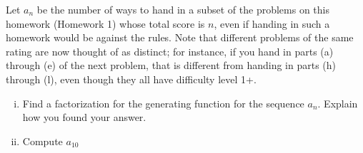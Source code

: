 \documentclass[12pt]{memoir}
\begin{document}
\begin{Ej}[Exercise 1]
 Let $a_n$ be the number of ways to hand in a subset of the problems on this homework (Homework 1) whose total score is $n$, even if handing in such a homework would be against the rules. Note that different problems of the same rating are now thought of as distinct; for instance, if you hand in parts (a) through (e) of the next problem, that is different from handing in parts (h) through (l), even though they all have difficulty level 1+.
\begin{enumerate}[i)]
    \item Find a factorization for the generating function for the sequence $a_n$. Explain how you found your answer.
    \item Compute $a_{10}$
\end{enumerate}
\end{Ej}
\end{document}
